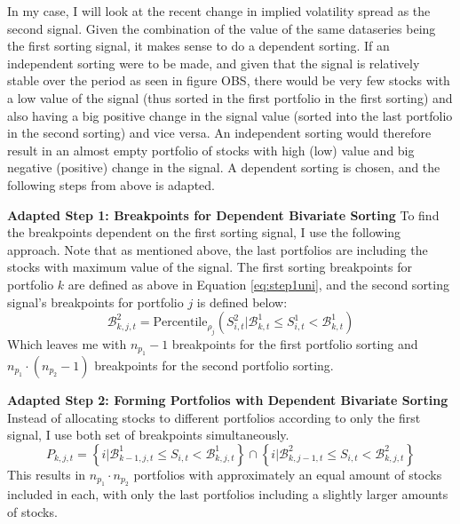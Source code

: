 In my case, I will look at the recent change in implied volatility spread as the second signal. Given the combination of the value of the same dataseries being the first sorting signal, it makes sense to do a dependent sorting. If an independent sorting were to be made, and given that the signal is relatively stable over the period as seen in figure OBS, there would be very few stocks with a low value of the signal (thus sorted in the first portfolio in the first sorting) and also having a big positive change in the signal value (sorted into the last portfolio in the second sorting) and vice versa. An independent sorting would therefore result in an almost empty portfolio of stocks with high (low) value and big negative (positive) change in the signal. A dependent sorting is chosen, and the following steps from above is adapted.

\textbf{Adapted Step 1: Breakpoints for Dependent Bivariate Sorting} To find the breakpoints dependent on the first sorting signal, I use the following approach. Note that as mentioned above, the last portfolios are including the stocks with maximum value of the signal. The first sorting breakpoints for portfolio $k$ are defined as above in Equation \ref{eq:step1uni}, and the second sorting signal's breakpoints for portfolio $j$ is defined below:
\begin{equation}
	\mathcal{B}_{k,j,t}^{2}=\text{Percentile}_{\rho_{j}}\left(S_{i,t}^{2}|\mathcal{B}_{k,t}^{1}\leq S_{i,t}^{1}<\mathcal{B}_{k,t}^{1}\right)
\end{equation}
Which leaves me with $n_{p_{1}} - 1$ breakpoints for the first portfolio sorting and $n_{p_{1}} \cdot \left(n_{p_{2}} - 1\right)$ breakpoints for the second portfolio sorting. 

\textbf{Adapted Step 2: Forming Portfolios with Dependent Bivariate Sorting} Instead of allocating stocks to different portfolios according to only the first signal, I use both set of breakpoints simultaneously.
\begin{equation}
	P_{k,j,t}=\left\{ i|\mathcal{B}_{k-1,j,t}^{1}\leq S_{i,t}<\mathcal{B}_{k,j,t}^{1}\right\} \cap\left\{ i|\mathcal{B}_{k,j-1,t}^{2}\leq S_{i,t}<\mathcal{B}_{k,j,t}^{2}\right\} 
\end{equation}
This results in $n_{p_{1}}\cdot n_{p_{2}}$ portfolios with approximately an equal amount of stocks included in each, with only the last portfolios including a slightly larger amounts of stocks.

